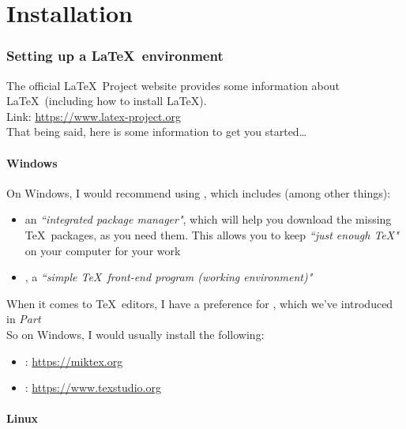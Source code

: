
\part{Installation}


\section*{Setting up a \LaTeX\ environment}

The official \LaTeX\ Project website %
provides some information about \LaTeX\ (including how to install \LaTeX). \\

Link: \url{https://www.latex-project.org} \\

That being said, here is some information to get you started\dots


\subsection*{Windows}

On Windows, I would recommend using \MiKTeX, which includes (among other things):

\begin{itemize}
	\item an \emph{``integrated package manager"}, which will help you download the missing \TeX\ packages, as you need them. This allows you to keep \emph{``just enough \TeX"} on your computer for your work \citep{miktex-project}
	\item \TeXworks, a \emph{``simple \TeX\ front-end program (working environment)"} \citep{texworks}
\end{itemize}

When it comes to \TeX\ editors, I have a preference for \TeXstudio, which we've introduced in \emph{Part } \\



So on Windows, I would usually install the following:
\begin{itemize}
	\item \MiKTeX:   \url{https://miktex.org}
	\item \TeXstudio: \url{https://www.texstudio.org} 
\end{itemize}


\subsection*{Linux}

